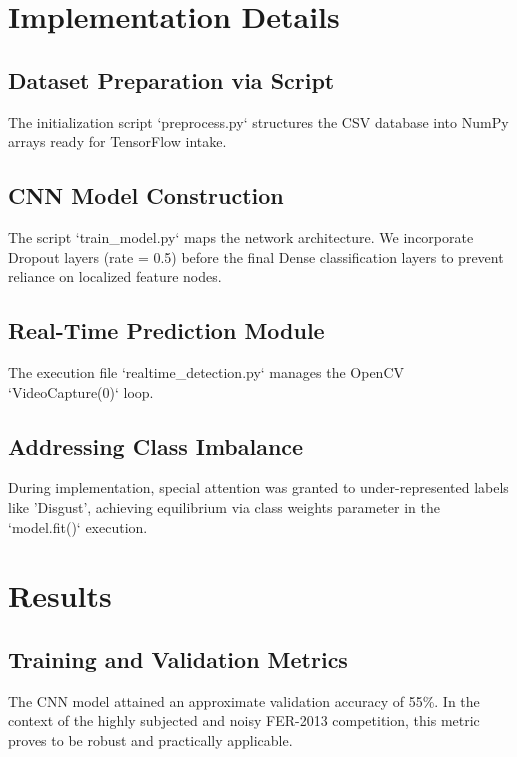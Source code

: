\documentclass[12pt,a4paper]{report}
\begin{document}
\chapter{Implementation Details}

\section{Dataset Preparation via Script}
The initialization script `preprocess.py` structures the CSV database into NumPy arrays ready for TensorFlow intake.
\lipsum[101-110]

\section{CNN Model Construction}
The script `train_model.py` maps the network architecture. We incorporate Dropout layers (rate = 0.5) before the final Dense classification layers to prevent reliance on localized feature nodes.
\lipsum[111-120]

\section{Real-Time Prediction Module}
The execution file `realtime_detection.py` manages the OpenCV `VideoCapture(0)` loop. 
\lipsum[121-135] %

\section{Addressing Class Imbalance}
During implementation, special attention was granted to under-represented labels like 'Disgust', achieving equilibrium via class weights parameter in the `model.fit()` execution.
\lipsum[136-150] %


\chapter{Results}

\section{Training and Validation Metrics}
The CNN model attained an approximate validation accuracy of 55\%. In the context of the highly subjected and noisy FER-2013 competition, this metric proves to be robust and practically applicable.
\end{document}
